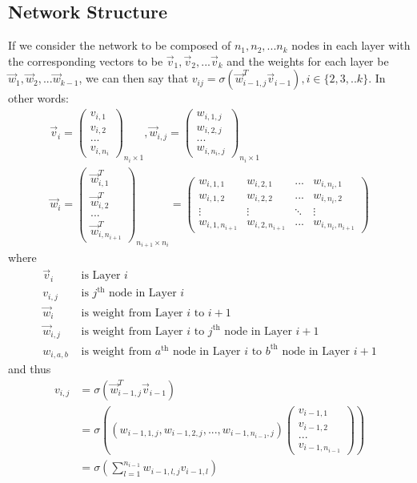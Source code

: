 \documentclass{article}
\begin{document}
\subsection{Network Structure}
If we consider the network to be composed of $n_1, n_2, ... n_k$ nodes in each layer with the corresponding vectors to be $\vec v_1,\vec v_2, ... \vec v_k$ and the weights for each layer be $ \vec w_1, \vec w_2, ... \vec w_{k-1}$, we can then say that $v_{ij}=\sigma(\vec w_{i-1,j}^T \vec v_{i-1}), i\in\{2,3,..k\}$. In other words: 
\begin{gather*}
\vec v_i=\begin{pmatrix}v_{i,1}\\v_{i,2}\\...\\v_{i,n_i}\end{pmatrix}_{n_i\times1},
\vec w_{i,j}=\begin{pmatrix}w_{i,1,j}\\w_{i,2,j}\\...\\w_{i,n_i,j}\end{pmatrix}_{n_i\times 1}\\
\vec w_{i}=\begin{pmatrix}\vec w_{i,1}^T\\\vec w_{i,2}^T\\...\\\vec w_{i,n_{i+1}}^T\end{pmatrix}_{n_{i+1}\times n_i}=\begin{pmatrix}w_{i,1,1}&w_{i,2,1}&...&w_{i,n_{i},1}\\w_{i,1,2}&w_{i,2,2}&...&w_{i,n_{i},2}\\\vdots&\vdots&\ddots&\vdots\\w_{i,1,n_{i+1}}&w_{i,2,n_{i+1}}&...&w_{i,n_i,n_{i+1}}\end{pmatrix}
\end{gather*}
where
\begin{align*}
\vec v_i&\text{ is Layer $i$}\\
v_{i,j}&\text{ is $j^\text{th}$ node in Layer $i$}\\
\vec w_i&\text{ is weight from Layer $i$ to $i+1$}\\
\vec w_{i,j}&\text{ is weight from Layer $i$ to $j^\text{th}$ node in Layer $i+1$}\\
w_{i,a,b}&\text{ is weight from $a^\text{th}$ node in Layer $i$ to $b^\text{th}$ node in Layer $i+1$}
\end{align*}
and thus
\begin{align*}
v_{i,j} &=\sigma(\vec w_{i-1,j}^T\vec v_{i-1})\\
&=  \sigma\left(
	(w_{i-1,1,j},w_{i-1,2,j},...,w_{i-1,n_{i-1},j})
	\begin{pmatrix}
		v_{i-1,1}\\v_{i-1,2}\\...\\v_{i-1,n_{i-1}}
	\end{pmatrix}
	\right)\\
&=\sigma\left(\sum_{l=1}^{n_{i-1}}w_{i-1,l,j}v_{i-1,l}\right)\\
\end{align*}
\end{document}
